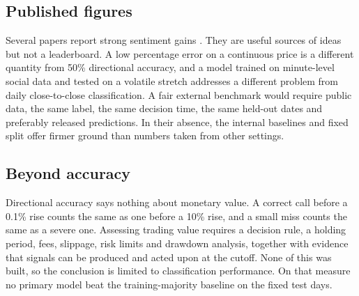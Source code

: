 \subsection{Published figures}
Several papers report strong sentiment gains \cite{huang2021,seabe2025,nezhad2026}. They are useful sources of ideas but not a leaderboard. A low percentage error on a continuous price is a different quantity from 50\% directional accuracy, and a model trained on minute-level social data and tested on a volatile stretch addresses a different problem from daily close-to-close classification. A fair external benchmark would require public data, the same label, the same decision time, the same held-out dates and preferably released predictions. In their absence, the internal baselines and fixed split offer firmer ground than numbers taken from other settings.

\subsection{Beyond accuracy}
Directional accuracy says nothing about monetary value. A correct call before a 0.1\% rise counts the same as one before a 10\% rise, and a small miss counts the same as a severe one. Assessing trading value requires a decision rule, a holding period, fees, slippage, risk limits and drawdown analysis, together with evidence that signals can be produced and acted upon at the cutoff. None of this was built, so the conclusion is limited to classification performance. On that measure no primary model beat the training-majority baseline on the fixed test days.
